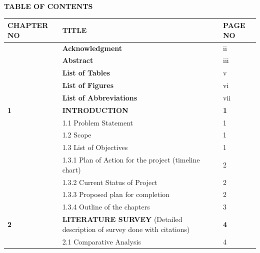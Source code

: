 \documentclass[12pt,a4paper]{article}
\begin{document}
\begin{center}
\begin{center}
{\Large \textbf{TABLE OF CONTENTS}}\\[1.mm]
\end{center}
\setlength{\tabcolsep}{4pt} %
\begin{tabular}{p{3.8cm} p{7.5cm} p{2.5cm}}
\hline
\textbf{CHAPTER NO} & \textbf{TITLE} & \textbf{PAGE NO} \\[2mm]
\hline

& \textbf{Acknowledgment} & \hspace{0.8cm} ii \\[1mm]
& \textbf{Abstract} & \hspace{0.8cm} iii \\[1mm]
& \textbf{List of Tables} & \hspace{0.8cm} v \\[1mm]
& \textbf{List of Figures} & \hspace{0.8cm} vi \\[1mm]
& \textbf{List of Abbreviations} & \hspace{0.8cm} vii \\[1mm]
\centering \textbf{1} & \textbf{INTRODUCTION} & \hspace{0.8cm} \textbf{1} \\[1mm]
& 1.1 Problem Statement &  \hspace{0.8cm} 1\\[1mm]
& 1.2 Scope & \hspace{0.8cm} 1 \\[1mm]
& 1.3 List of Objectives & \hspace{0.8cm} 1 \\[1mm]
& 1.3.1 Plan of Action for the project \small{(timeline chart)} & \hspace{0.8cm} 2 \\[1mm]
& 1.3.2 Current Status of Project & \hspace{0.8cm} 2 \\[1mm]
& 1.3.3 Proposed plan for completion  & \hspace{0.8cm} 2 \\[1mm]
& 1.3.4 Outline of the chapters  & \hspace{0.8cm} 3 \\[1mm]


\centering \textbf{2} & \textbf{\MakeUppercase{Literature Survey} }(Detailed description of survey done with citations)	& \hspace{0.8cm} \textbf{4} \\[1mm] 
& 2.1 Comparative Analysis &  \hspace{0.8cm} 4\\[1mm]


\end{tabular}
\end{center}
\end{document}
